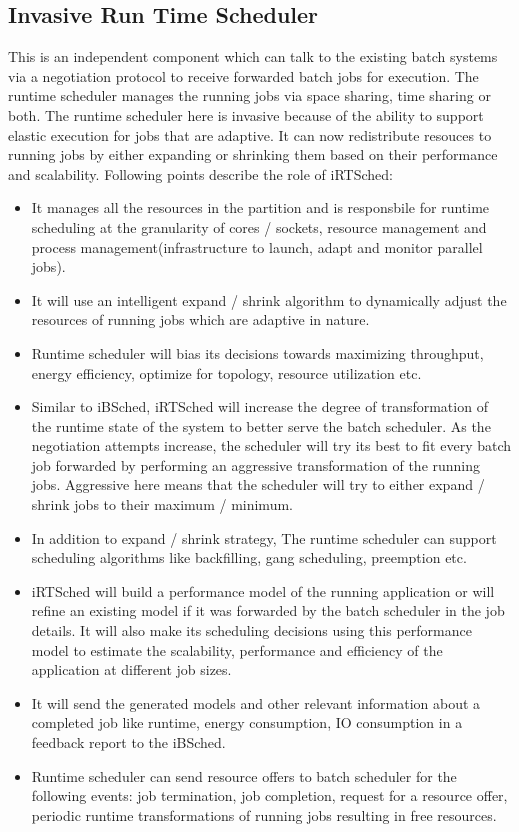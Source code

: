 \subsection{Invasive Run Time Scheduler}
This is an independent component which can talk to the existing batch systems via a negotiation protocol to receive forwarded batch jobs for execution. The runtime scheduler manages the running jobs via space sharing, time sharing or both. The runtime scheduler here is invasive because of the ability to support elastic execution for jobs that are adaptive. It can now redistribute resouces to running jobs by either expanding or shrinking them based on their performance and scalability. Following points describe the role of iRTSched:
\begin{itemize}
\item It manages all the resources in the partition and is responsbile for runtime scheduling at the granularity of cores / sockets, resource management and process management(infrastructure to launch, adapt and monitor parallel jobs).
\item It will use an intelligent expand / shrink algorithm to dynamically adjust the resources of running jobs which are adaptive in nature. 
\item Runtime scheduler will bias its decisions towards maximizing throughput, energy efficiency, optimize for topology, resource utilization etc.
\item Similar to iBSched, iRTSched will increase the degree of transformation of the runtime state of the system to better serve the batch scheduler. As the negotiation attempts increase, the scheduler will try its best to fit every batch job forwarded by performing an aggressive transformation of the running jobs. Aggressive here means that the scheduler will try to either expand / shrink jobs to their maximum / minimum.
\item In addition to expand / shrink strategy, The runtime scheduler can support scheduling algorithms like backfilling, gang scheduling, preemption etc.
\item iRTSched will build a performance model of the running application or will refine an existing model if it was forwarded by the batch scheduler in the job details. It will also make its scheduling decisions using this performance model to estimate the scalability, performance and efficiency of the application at different job sizes.
\item It will send the generated models and other relevant information about a completed job like runtime, energy consumption, IO consumption in a feedback report to the iBSched.
\item Runtime scheduler can send resource offers to batch scheduler for the following events: job termination, job completion, request for a resource offer, periodic runtime transformations of running jobs resulting in free resources.
\end{itemize}
